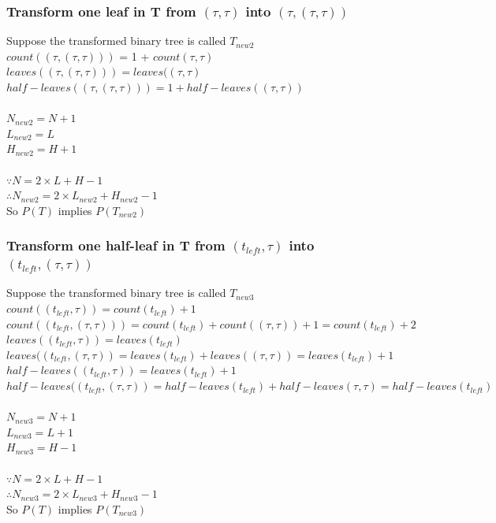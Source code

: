 \documentclass{article} %
\begin{document}
\subsubsection*{Transform one leaf in T from $(\tau, \tau )$ into $(\tau,(\tau,\tau))$}
Suppose the transformed binary tree is called $T_{new2}$\\
$count((\tau,(\tau,\tau)))$ = 1 + $count(\tau, \tau)$\\
$leaves((\tau,(\tau,\tau))) = leaves((\tau,\tau)$\\
$half-leaves((\tau,(\tau,\tau))) = 1 + half-leaves((\tau,\tau))$\\
\\
$N_{new2} = N + 1$\\
$L_{new2} = L $\\
$H_{new2} = H + 1$\\
\\
$\because N = 2\times L + H - 1$\\
$\therefore N_{new2} = 2\times L_{new2} + H_{new2} - 1$\\
So $P(T)$ implies $P(T_{new2})$\\

\subsubsection*{Transform one half-leaf in T from $(t_{left}, \tau )$ into $(t_{left},(\tau,\tau))$}
Suppose the transformed binary tree is called $T_{new3}$\\
$count((t_{left},\tau)) = count(t_{left}) + 1$\\
$count((t_{left},(\tau,\tau))) = count(t_{left}) + count((\tau,\tau))+1 = count(t_{left}) + 2$\\
$leaves((t_{left},\tau)) = leaves(t_{left})$\\
$leaves((t_{left},(\tau,\tau)) = leaves(t_{left}) + leaves((\tau,\tau)) = leaves(t_{left}) + 1$\\
$half-leaves((t_{left},\tau)) = leaves(t_{left}) + 1$\\
$half-leaves((t_{left},(\tau,\tau)) = half-leaves(t_{left}) + half-leaves(\tau, \tau) = half-leaves(t_{left})$\\
\\
$N_{new3} = N + 1$\\
$L_{new3} = L + 1$\\
$H_{new3} = H - 1$\\
\\
$\because N = 2\times L + H - 1$\\
$\therefore N_{new3} = 2\times L_{new3} + H_{new3} - 1$\\
So $P(T)$ implies $P(T_{new3})$\\
\end{document}
